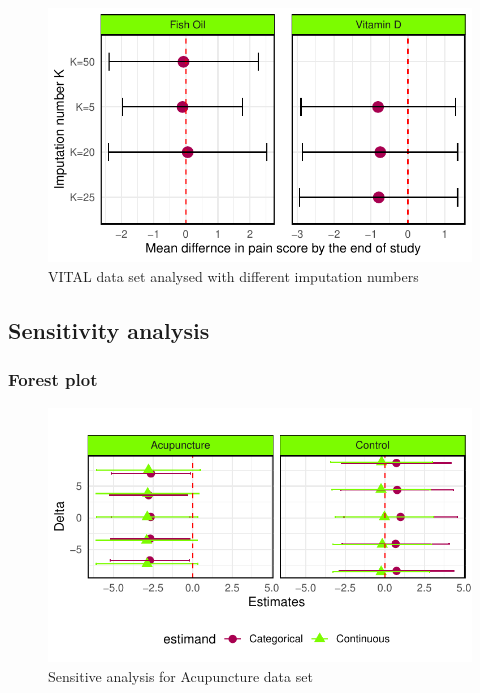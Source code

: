 \documentclass{article}
\newcommand{\pandocbounded}[1]{#1}
\begin{document}
\begin{figure}
\centering
\pandocbounded{\includegraphics[keepaspectratio]{Final_Report_files/figure-latex/unnamed-chunk-32-1.pdf}}
\caption{VITAL data set analysed with different imputation numbers}
\end{figure}

\subsection{Sensitivity analysis}\label{sensitivity-analysis-2}

\subsubsection{Forest plot}\label{forest-plot}

\begin{figure}
\centering
\pandocbounded{\includegraphics[keepaspectratio]{Final_Report_files/figure-latex/unnamed-chunk-33-1.pdf}}
\caption{Sensitive analysis for Acupuncture data set}
\end{figure}
\end{document}
